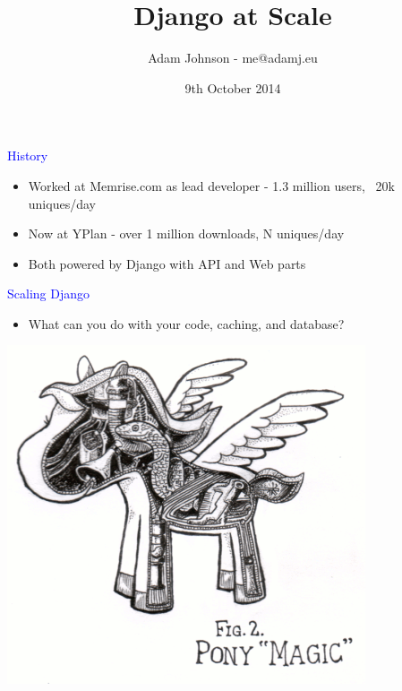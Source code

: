 \documentclass[landscape]{slides}
\title{Django at Scale}
\author{Adam Johnson - me@adamj.eu}
\date{9th October 2014}
\begin{document}
\maketitle


\begin{slide}

    \textcolor{blue}{\Large{History}}

    \begin{itemize}
        \item Worked at Memrise.com as lead developer - 1.3 million users, ~20k uniques/day
        \item Now at YPlan - over 1 million downloads, N uniques/day
        \item Both powered by Django with API and Web parts
    \end{itemize}

\end{slide}


\begin{slide}

    \textcolor{blue}{\Large{Scaling Django}}

    \begin{itemize}
        \item What can you do with your code, caching, and database?
    \end{itemize}

    \begin{center}
        \includegraphics[height=10cm]{pony-magic}
    \end{center}

\end{slide}
\end{document}
